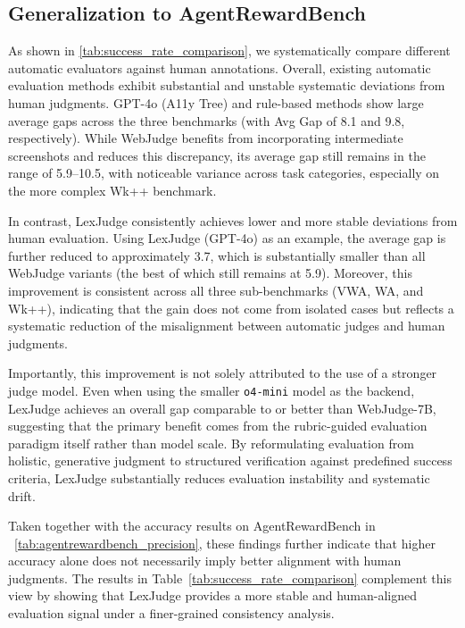
\subsection{Generalization to AgentRewardBench}
\label{app:generalization2}
As shown in \cref{tab:success_rate_comparison}, we systematically compare different automatic evaluators against human annotations. Overall, existing automatic evaluation methods exhibit substantial and unstable systematic deviations from human judgments. GPT-4o (A11y Tree) and rule-based methods show large average gaps across the three benchmarks (with Avg Gap of 8.1 and 9.8, respectively). While WebJudge benefits from incorporating intermediate screenshots and reduces this discrepancy, its average gap still remains in the range of 5.9--10.5, with noticeable variance across task categories, especially on the more complex Wk++ benchmark.

In contrast, LexJudge consistently achieves lower and more stable deviations from human evaluation. Using LexJudge (GPT-4o) as an example, the average gap is further reduced to approximately 3.7, which is substantially smaller than all WebJudge variants (the best of which still remains at 5.9). Moreover, this improvement is consistent across all three sub-benchmarks (VWA, WA, and Wk++), indicating that the gain does not come from isolated cases but reflects a systematic reduction of the misalignment between automatic judges and human judgments.

Importantly, this improvement is not solely attributed to the use of a stronger judge model. Even when using the smaller \texttt{o4-mini} model as the backend, LexJudge achieves an overall gap comparable to or better than WebJudge-7B, suggesting that the primary benefit comes from the rubric-guided evaluation paradigm itself rather than model scale. By reformulating evaluation from holistic, generative judgment to structured verification against predefined success criteria, LexJudge substantially reduces evaluation instability and systematic drift.

Taken together with the accuracy results on AgentRewardBench in ~\cref{tab:agentrewardbench_precision}, these findings further indicate that higher accuracy alone does not necessarily imply better alignment with human judgments. The results in Table~\ref{tab:success_rate_comparison} complement this view by showing that LexJudge provides a more stable and human-aligned evaluation signal under a finer-grained consistency analysis.

